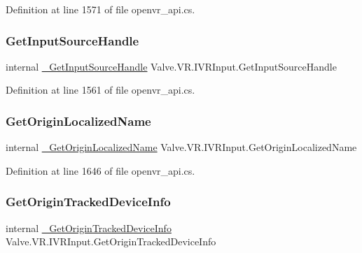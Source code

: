Definition at line 1571 of file openvr\+\_\+api.\+cs.

\mbox{\label{struct_valve_1_1_v_r_1_1_i_v_r_input_a04088eb27474e4d6964ff49df0d96aa8}} 
\subsubsection{\texorpdfstring{GetInputSourceHandle}{GetInputSourceHandle}}
{\footnotesize\ttfamily internal \mbox{\hyperlink{struct_valve_1_1_v_r_1_1_i_v_r_input_a60fb16bdfa85d70a30f566ddd0c52fe2}{\+\_\+\+Get\+Input\+Source\+Handle}} Valve.\+V\+R.\+I\+V\+R\+Input.\+Get\+Input\+Source\+Handle}



Definition at line 1561 of file openvr\+\_\+api.\+cs.

\mbox{\label{struct_valve_1_1_v_r_1_1_i_v_r_input_a3a2f4277159d146a50e7054c0426e72f}} 
\subsubsection{\texorpdfstring{GetOriginLocalizedName}{GetOriginLocalizedName}}
{\footnotesize\ttfamily internal \mbox{\hyperlink{struct_valve_1_1_v_r_1_1_i_v_r_input_a17e8c670555ed63bd87786abfe4f7b1c}{\+\_\+\+Get\+Origin\+Localized\+Name}} Valve.\+V\+R.\+I\+V\+R\+Input.\+Get\+Origin\+Localized\+Name}



Definition at line 1646 of file openvr\+\_\+api.\+cs.

\mbox{\label{struct_valve_1_1_v_r_1_1_i_v_r_input_a6d0207256fdbd33a0ed3db1913ccbb6c}} 
\subsubsection{\texorpdfstring{GetOriginTrackedDeviceInfo}{GetOriginTrackedDeviceInfo}}
{\footnotesize\ttfamily internal \mbox{\hyperlink{struct_valve_1_1_v_r_1_1_i_v_r_input_add5ead75e93d50c200dd32cfd51abb31}{\+\_\+\+Get\+Origin\+Tracked\+Device\+Info}} Valve.\+V\+R.\+I\+V\+R\+Input.\+Get\+Origin\+Tracked\+Device\+Info}



